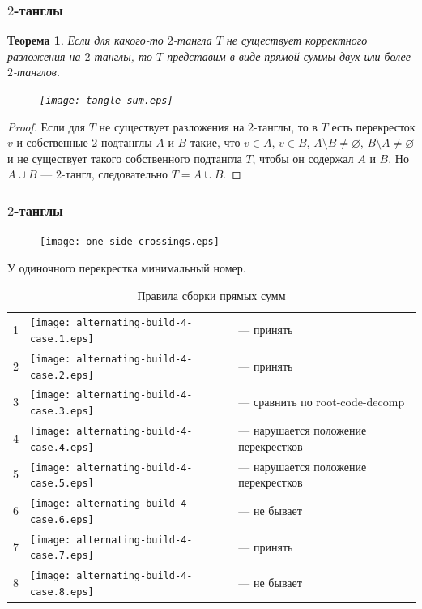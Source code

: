 \documentclass[dvips, intlimits, 9pt, unicode, notheorems]{beamer}
\theoremstyle{plain}
\newtheorem{theorem}{Теорема}
\theoremstyle{definition}
\begin{document}
	\begin{frame}
		\frametitle{$2$-танглы}

		\begin{theorem}
			Если для какого-то $2$-тангла $T$ не существует корректного разложения на $2$-танглы, то $T$ представим в виде прямой
			суммы двух или более $2$-танглов.
			\begin{figure}[H]
				\centering
				\texttt{[image: tangle-sum.eps]}
			\end{figure}
		\end{theorem}
		\begin{proof}
			Если для $T$ не существует разложения на $2$-танглы, то в $T$ есть перекресток $v$ и собственные $2$-подтанглы $A$ и $B$
			такие, что $v \in A$, $v \in B$, $A\setminus B\neq\varnothing$, $B\setminus A\neq\varnothing$ и не существует такого
			собственного подтангла $T$, чтобы он содержал $A$ и $B$. Но $A \cup B$ --- $2$-тангл, следовательно $T = A \cup B$.
		\end{proof}
	\end{frame}

	\begin{frame}
		\frametitle{$2$-танглы}

		\begin{figure}[ht]
			\centering
			\texttt{[image: one-side-crossings.eps]}
		\end{figure}

		
		\begin{center}
			У одиночного перекрестка минимальный номер.
		\end{center}

		\begin{table}[ht]
			\caption{Правила сборки прямых сумм\label{table:sums-rules}}
			\centering
			\begin{tabular}{cm{22mm}l}
				\hline
				1 & \texttt{[image: alternating-build-4-case.1.eps]} & --- принять \\
				2 & \texttt{[image: alternating-build-4-case.2.eps]} & --- принять \\
				3 & \texttt{[image: alternating-build-4-case.3.eps]} & --- сравнить по root-code-decomp \\
				4 & \texttt{[image: alternating-build-4-case.4.eps]} & --- нарушается положение перекрестков \\
				5 & \texttt{[image: alternating-build-4-case.5.eps]} & --- нарушается положение перекрестков \\
				6 & \texttt{[image: alternating-build-4-case.6.eps]} & --- не бывает \\
				7 & \texttt{[image: alternating-build-4-case.7.eps]} & --- принять \\
				8 & \texttt{[image: alternating-build-4-case.8.eps]} & --- не бывает \\
				\hline
			\end{tabular}
		\end{table}

	\end{frame}
\end{document}

